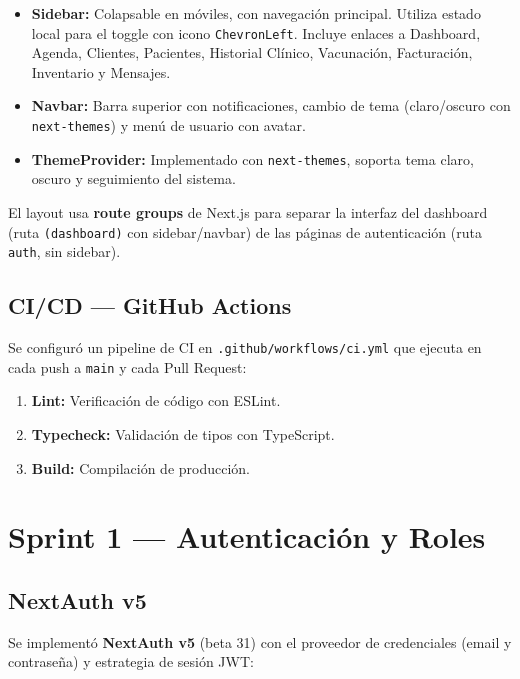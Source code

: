 \documentclass[12pt,a4paper]{article}
\begin{document}
\begin{itemize}[leftmargin=*]
    \item \textbf{Sidebar:} Colapsable en móviles, con navegación principal.
          Utiliza estado local para el toggle con icono \texttt{ChevronLeft}.
          Incluye enlaces a Dashboard, Agenda, Clientes, Pacientes, Historial
          Clínico, Vacunación, Facturación, Inventario y Mensajes.
    \item \textbf{Navbar:} Barra superior con notificaciones, cambio de tema
          (claro/oscuro con \texttt{next-themes}) y menú de usuario con avatar.
    \item \textbf{ThemeProvider:} Implementado con \texttt{next-themes}, soporta
          tema claro, oscuro y seguimiento del sistema.
\end{itemize}

El layout usa \textbf{route groups} de Next.js para separar la interfaz del
dashboard (ruta \texttt{(dashboard)} con sidebar/navbar) de las páginas de
autenticación (ruta \texttt{auth}, sin sidebar).

\subsection{CI/CD --- GitHub Actions}

Se configuró un pipeline de CI en \texttt{.github/workflows/ci.yml} que ejecuta
en cada push a \texttt{main} y cada Pull Request:

\begin{enumerate}[leftmargin=*]
    \item \textbf{Lint:} Verificación de código con ESLint.
    \item \textbf{Typecheck:} Validación de tipos con TypeScript.
    \item \textbf{Build:} Compilación de producción.
\end{enumerate}

\section{Sprint 1 --- Autenticación y Roles}

\subsection{NextAuth v5}

Se implementó \textbf{NextAuth v5} (beta 31) con el proveedor de credenciales
(email y contraseña) y estrategia de sesión JWT:
\end{document}
